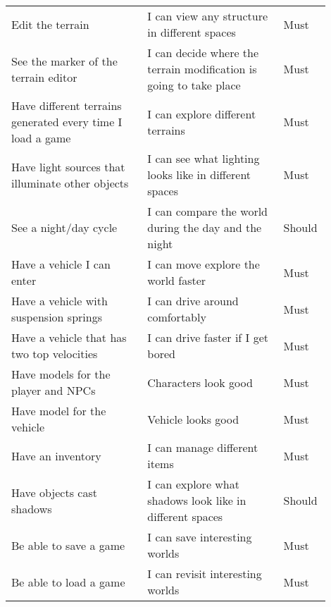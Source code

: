 \documentclass[12pt]{article}
\begin{document}
\begin{table}[H]
\begin{tabular}{p{0.4\linewidth}|p{0.4\linewidth}|p{0.1\linewidth}}
        Edit the terrain                                           & I can view any structure in different spaces                       & Must           \\
        See the marker of the terrain editor                       & I can decide where the terrain modification is going to take place & Must           \\
        Have different terrains generated every time I load a game & I can explore different terrains                                   & Must           \\
        Have light sources that illuminate other objects           & I can see what lighting looks like in different spaces             & Must           \\
        See a night/day cycle                                      & I can compare the world during the day and the night               & Should         \\
        Have a vehicle I can enter                                 & I can move explore the world faster                                & Must           \\
        Have a vehicle with suspension springs                     & I can drive around comfortably                                     & Must           \\
        Have a vehicle that has two top velocities                 & I can drive faster if I get bored                                  & Must           \\
        Have models for the player and NPCs                        & Characters look good                                               & Must           \\
        Have model for the vehicle                                 & Vehicle looks good                                                 & Must           \\
        Have an inventory                                          & I can manage different items                                       & Must           \\
        Have objects cast shadows                                  & I can explore what shadows look like in different spaces           & Should         \\
        Be able to save a game                                     & I can save interesting worlds                                      & Must           \\
        Be able to load a game                                     & I can revisit interesting worlds                                   & Must           \\

\end{tabular}
\end{table}
\end{document}
